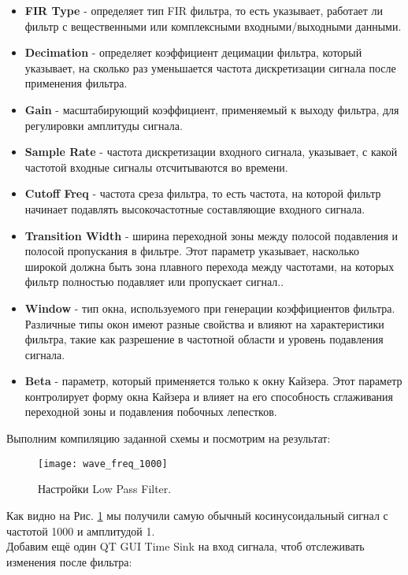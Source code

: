 \documentclass[a4paper,12pt]{extarticle}
\begin{document}
\begin{itemize}[nolistsep]
    \item \textbf{FIR Type} - определяет тип FIR фильтра, то есть указывает, работает ли 
    фильтр с вещественными или комплексными входными/выходными данными.
    \item \textbf{Decimation} - определяет коэффициент децимации фильтра, который указывает, 
    на сколько раз уменьшается частота дискретизации сигнала после применения фильтра.
    \item \textbf{Gain} - масштабирующий коэффициент, применяемый к выходу фильтра, 
    для регулировки амплитуды сигнала.
    \item \textbf{Sample Rate} - частота дискретизации входного сигнала, указывает, с 
    какой частотой входные сигналы отсчитываются во времени. 
    \item \textbf{Cutoff Freq} - частота среза фильтра, то есть частота, на 
    которой фильтр начинает подавлять высокочастотные составляющие входного сигнала.
    \item \textbf{Transition Width} - ширина переходной зоны между полосой подавления 
    и полосой пропускания в фильтре. Этот параметр указывает, насколько широкой 
    должна быть зона плавного перехода между частотами, на которых фильтр полностью 
    подавляет или пропускает сигнал.. 
    \item \textbf{Window} - тип окна, используемого при генерации коэффициентов фильтра. 
    Различные типы окон имеют разные свойства и влияют на характеристики фильтра, такие 
    как разрешение в частотной области и уровень подавления сигнала.
    \item \textbf{Beta} - параметр, который применяется только к окну Кайзера. 
    Этот параметр контролирует форму окна Кайзера и влияет на его способность 
    сглаживания переходной зоны и подавления побочных лепестков.
\end{itemize}
Выполним компиляцию заданной схемы и посмотрим на результат:
\begin{figure}[H]
    \centering
    \texttt{[image: wave\_freq\_1000]}
    \caption{Настройки Low Pass Filter.} %
    \label{fig:wave_freq_1000} %
\end{figure}
Как видно на Рис. \ref{fig:wave_freq_1000} мы получили самую обычный косинусоидальный сигнал 
с частотой 1000 и амплитудой 1.\\
Добавим ещё один QT GUI Time Sink на вход сигнала, чтоб отслеживать изменения после фильтра:
\end{document}

